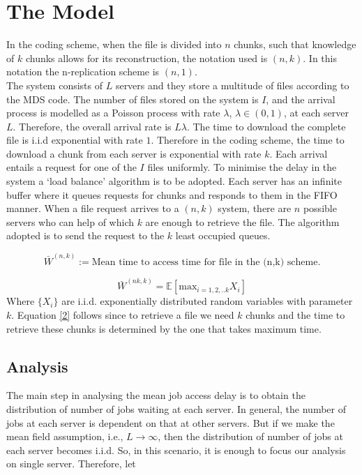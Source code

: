 \documentclass{article}
\begin{document}
\section{The Model}

In the coding scheme, when the file is divided into $ n $ chunks, such that knowledge of $ k $ chunks allows for its reconstruction, the notation used is $ (n,k) $. In this notation the n-replication scheme is $ (n,1) $.\\

The system consists of $ L $ servers and they store a multitude of files according to the MDS code. The number of files stored on the system is $ I $, and the arrival process is modelled as a Poisson process with rate $ \lambda $, $ \lambda\in (0,1) $, at each server $L$. Therefore, the overall arrival rate is $L\lambda$. The time to download the complete file is i.i.d exponential with rate $1$. Therefore in the coding scheme, the time to download a chunk from each server is exponential with rate $k$.  Each arrival entails a request for  one of the $ I $ files uniformly. To minimise the delay in the system a `load balance' algorithm is to be adopted. Each server has an infinite buffer where it queues requests for chunks and responds to them in the FIFO manner. When a file request arrives to a $ (n,k) $ system, there are $ n $ possible servers who can help of which $ k $ are enough to retrieve the file. The algorithm adopted is to send the request to the $k$ least occupied queues. 
\medskip

\begin{equation}
\bar{W}^{(n,k)}:= \text{Mean time to access time for file in the (n,k) scheme}.
\label{1}
\end{equation}

\begin{equation}
\bar{W}^{(nk,k)}=\mathbb{E}\left[ \text{max}_{i=1,2,..k} X_i \right]
\label{2}
\end{equation}
Where $\{ X_i \}$ are i.i.d. exponentially distributed random variables with parameter $ k $. Equation \eqref{2} follows since to retrieve a file we need $ k $ chunks and the time to retrieve these chunks is determined by the one that takes maximum time.

\subsection{Analysis}
The main step in analysing the mean job access delay is to obtain the distribution of number of jobs waiting at each server. In general, the number of jobs at each server is dependent on that at other servers. But if we make the mean field assumption, i.e., $ L\rightarrow \infty $, then the distribution of number of jobs at each server becomes i.i.d. So, in this scenario, it is enough to focus our analysis on single server. Therefore, let 
\end{document}
